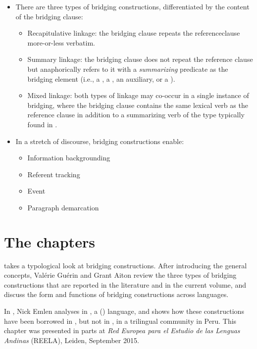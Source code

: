 \begin{refsection}
 \begin{itemize}  
\item There are three types of bridging constructions, differentiated by the content of the bridging clause: 
\begin{itemize}
\item Recapitulative linkage: the bridging clause repeats the reference\linebreak clause more-or-less verbatim. 
\item  Summary linkage: the bridging clause does not repeat the reference clause but anaphorically refers to it with a \textit{summarizing} predicate as the bridging element (i.e., a , a , an auxiliary, or a ). 
\item Mixed linkage: both types of linkage may co-occur in a single instance of bridging, where the bridging clause contains the same lexical verb as the reference clause in addition to a summarizing verb of the type typically found in .
\end{itemize}
\end{itemize}

 \begin{itemize} 
\item  In a stretch of discourse, bridging constructions enable:
\begin{itemize}
\item  Information backgrounding
\item  Referent tracking
\item  Event  
\item  Paragraph demarcation
\end{itemize}
\end{itemize}


\section*{The chapters}

 takes a typological look at bridging constructions. After introducing the general concepts, Valérie Guérin and Grant Aiton review the three types of bridging constructions that are reported in the literature and in the current volume, and discuss the form and functions of bridging constructions across languages. 

In , Nick Emlen analyses  in , a  () language, and shows how these constructions have been borrowed in , but not in , in a trilingual community in Peru. This chapter was presented in parts at \textit{Red Europea para el Estudio de las Lenguas Andinas} (REELA), Leiden, September 2015. 


\end{refsection}
